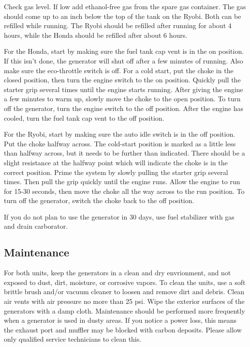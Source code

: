 \documentclass[12pt]{../SOP3_beta}
\begin{document}
\NP Check gas level. If low add ethanol-free gas from the spare gas container. The gas should come up to an inch below the top of the tank on the Ryobi. Both can be refilled while running. The Ryobi should be refilled after running for about 4 hours, while the Honda should be refilled after about 6 hours. 

\NP For the Honda, start by making sure the fuel tank cap vent is in the on position. If this isn't done, the generator will shut off after a few minutes of running. Also make sure the eco-throttle switch is off. For a cold start, put the choke in the closed position, then turn the engine switch to the on position. 
  Quickly pull the starter grip several times until the engine starts running. After giving the engine a few minutes to warm up, slowly move the choke to the open position.
  To turn off the generator, turn the engine switch to the off position. After the engine has cooled, turn the fuel tank cap vent to the off position. 

\NP For the Ryobi, start by making sure the auto idle switch is in the off position. Put the choke halfway across. The cold-start position is marked as a little less than halfway across, but it needs to be further than indicated. There should be a slight resistance at the halfway point which will indicate the choke is in the correct position.
  Prime the system by slowly pulling the starter grip several times. Then pull the grip quickly until the engine runs. Allow the engine to run for 15-30 seconds, then move the choke all the way across to the run position.
  To turn off the generator, switch the choke back to the off position.

\NP If you do not plan to use the generator in 30 days, use fuel stabilizer with gas and drain carborator. 

\subsection{Maintenance}

\NP For both units, keep the generators in a clean and dry envrionment, and not exposed to dust, dirt, moisture, or corrosive vapors. To clean the units, use a soft brittle brush and/or vacuum cleaner to loosen and remove dirt and debris. Clean air vents with air pressure no more than 25 psi. Wipe the exterior surfaces of the generators with a damp cloth. Maintenance should be performed more frequently when a generator is used in dusty areas. If you notice a power loss, this means the exhaust port and muffler may be blocked with carbon deposits. Please allow only qualified service technicians to clean this.
\end{document}
